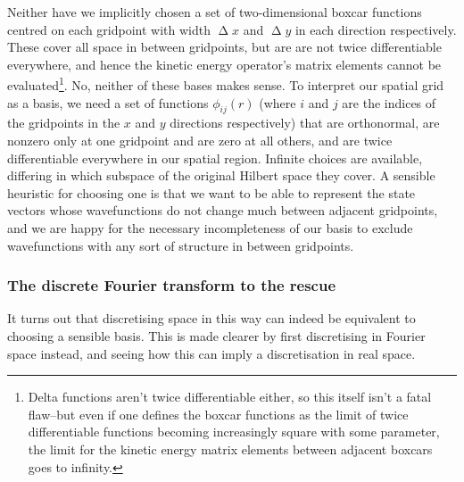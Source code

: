 Neither have we implicitly chosen a set of two-dimensional boxcar functions centred on each gridpoint with width $\upDelta x$ and $\upDelta y$ in each direction respectively. These cover all space in between gridpoints, but are are not twice differentiable everywhere, and hence the kinetic energy operator's matrix elements cannot be evaluated\footnote{Delta functions aren't twice differentiable either, so this itself isn't a fatal flaw--but even if one defines the boxcar functions as the limit of twice differentiable functions becoming increasingly square with some parameter, the limit for the kinetic energy matrix elements between adjacent boxcars goes to infinity.}. No, neither of these bases makes sense. To interpret our spatial grid as a basis, we need a set of functions $\phi_{ij}(r)$ (where $i$ and $j$ are the indices of the gridpoints in the $x$ and $y$ directions respectively) that are orthonormal, are nonzero only at one gridpoint and are zero at all others, and are twice differentiable everywhere in our spatial region. Infinite choices are available, differing in which subspace of the original Hilbert space they cover. A sensible heuristic for choosing one is that we want to be able to represent the state vectors whose wavefunctions do not change much between adjacent gridpoints, and we are happy for the necessary incompleteness of our basis to exclude wavefunctions with any sort of structure in between gridpoints.

\subsubsection{The discrete Fourier transform to the rescue}

It turns out that discretising space in this way can indeed be equivalent to choosing a sensible basis. This is made clearer by first discretising in Fourier space instead, and seeing how this can imply a discretisation in real space.

